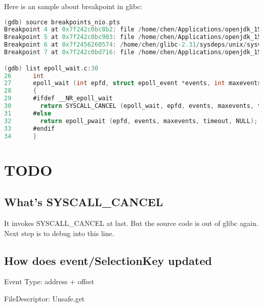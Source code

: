 \documentclass[12pt]{article}
\begin{document}
Here is an sample about breakpoint in glibc:
\begin{lstlisting}[language=c]
(gdb) source breakpoints_nio.pts 
Breakpoint 4 at 0x7f242c0bc8b2: file /home/chen/Applications/openjdk_15_src/jdk/src/java.base/linux/native/libnio/ch/EPoll.c, line 84.
Breakpoint 5 at 0x7f242c0bc903: file /home/chen/Applications/openjdk_15_src/jdk/src/java.base/linux/native/libnio/ch/EPoll.c, line 87.
Breakpoint 6 at 0x7f2456260574: /home/chen/glibc-2.31/sysdeps/unix/sysv/linux/epoll_wait.c:30. (2 locations)
Breakpoint 7 at 0x7f242c0bd716: file /home/chen/Applications/openjdk_15_src/jdk/src/java.base/unix/native/libnio/ch/FileDispatcherImpl.c, line 299.

(gdb) list epoll_wait.c:30
26      int
27      epoll_wait (int epfd, struct epoll_event *events, int maxevents, int timeout)
28      {
29      #ifdef __NR_epoll_wait
30        return SYSCALL_CANCEL (epoll_wait, epfd, events, maxevents, timeout);
31      #else
32        return epoll_pwait (epfd, events, maxevents, timeout, NULL);
33      #endif
34      }

\end{lstlisting}


\section{TODO}
\subsection{What's SYSCALL\_CANCEL}
It invokes SYSCALL\_CANCEL at last. But the source code is out of glibc again. Next step is to debug into this line.

\subsection{How does event/SelectionKey updated}
Event Type: address + offset

FileDescriptor: Unsafe.get 




\end{document}
